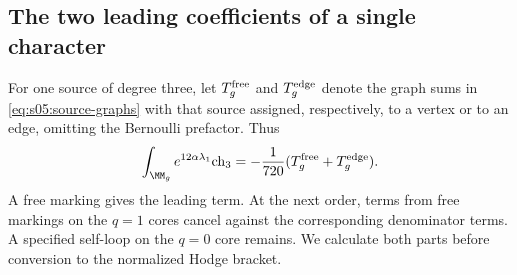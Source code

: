 \subsection{The two leading coefficients of a single character}
\label{subsec:s05:02}

For one source of degree three, let $T_g^{\rm free}$ and
$T_g^{\rm edge}$ denote the graph sums in
\eqref{eq:s05:source-graphs} with that source assigned, respectively,
to a vertex or to an edge, omitting the Bernoulli prefactor. Thus
\begin{equation}\label{eq:s05:single-source}
 \int_{\MM_g}e^{12\alpha\lambda_1}\mathrm{ch}_3
       =-\frac1{720}(T_g^{\rm free}+T_g^{\rm edge}).
\end{equation}
A free marking gives the leading term. At the next order, terms
from free markings on the $q=1$ cores cancel against the corresponding
denominator terms.
A specified self-loop on the $q=0$ core remains. We calculate both
parts before conversion to the normalized Hodge bracket.

